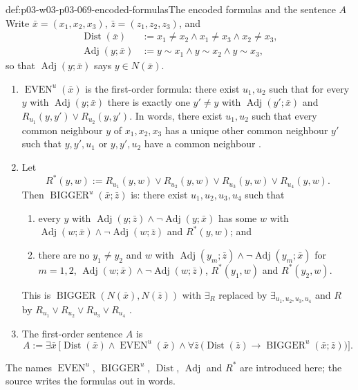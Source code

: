 \begin{hbdefinition}{def:p03-w03-p03-069-encoded-formulas}{The encoded formulas and the sentence \(A\)}
Write \(\bar x=(x_1,x_2,x_3)\), \(\bar z=(z_1,z_2,z_3)\), and
\[
  \begin{aligned}
  \operatorname{Dist}(\bar x)&:=x_1\neq x_2\wedge x_1\neq x_3\wedge x_2\neq x_3,\\
  \operatorname{Adj}(y;\bar x)&:=y\sim x_1\wedge y\sim x_2\wedge y\sim x_3,
  \end{aligned}
\]
so that \(\operatorname{Adj}(y;\bar x)\) says \(y\in N(\bar x)\).
\begin{enumerate}
\item \(\operatorname{EVEN}^u(\bar x)\) is the first-order formula: there
exist \(u_1,u_2\) such that for every \(y\) with \(\operatorname{Adj}(y;\bar x)\)
there is exactly one \(y'\neq y\) with \(\operatorname{Adj}(y';\bar x)\) and
\(R_{u_1}(y,y')\vee R_{u_2}(y,y')\).  In words, there exist \(u_1,u_2\)
such that every common neighbour \(y\) of \(x_1,x_2,x_3\) has a unique other
common neighbour \(y'\) such that \(y,y',u_1\) or \(y,y',u_2\) have a common
neighbour \cite[p.~18]{Spencer2007LogicRandomStructuresAuthor}.
\item Let
\[
  R^{*}(y,w):=R_{u_1}(y,w)\vee R_{u_2}(y,w)\vee R_{u_3}(y,w)\vee R_{u_4}(y,w).
\]
Then \(\operatorname{BIGGER}^u(\bar x;\bar z)\) is: there exist
\(u_1,u_2,u_3,u_4\) such that
\begin{enumerate}
\item every \(y\) with \(\operatorname{Adj}(y;\bar z)\wedge\neg\operatorname{Adj}(y;\bar x)\)
has some \(w\) with \(\operatorname{Adj}(w;\bar x)\wedge\neg\operatorname{Adj}(w;\bar z)\)
and \(R^{*}(y,w)\); and
\item there are no \(y_1\neq y_2\) and \(w\) with
\(\operatorname{Adj}(y_m;\bar z)\wedge\neg\operatorname{Adj}(y_m;\bar x)\) for
\(m=1,2\), \(\operatorname{Adj}(w;\bar x)\wedge\neg\operatorname{Adj}(w;\bar z)\),
\(R^{*}(y_1,w)\) and \(R^{*}(y_2,w)\).
\end{enumerate}
This is \(\operatorname{BIGGER}(N(\bar x),N(\bar z))\) with \(\exists_R\)
replaced by \(\exists_{u_1,u_2,u_3,u_4}\) and \(R\) by
\(R_{u_1}\vee R_{u_2}\vee R_{u_3}\vee R_{u_4}\)
\cite[p.~18]{Spencer2007LogicRandomStructuresAuthor}.
\item The first-order sentence \(A\) is
\[
  A:=\exists\bar x\,\bigl[\operatorname{Dist}(\bar x)\wedge
  \operatorname{EVEN}^u(\bar x)\wedge
  \forall\bar z\,\bigl(\operatorname{Dist}(\bar z)\rightarrow
  \operatorname{BIGGER}^u(\bar x;\bar z)\bigr)\bigr].
\]
\end{enumerate}
The names \(\operatorname{EVEN}^u\), \(\operatorname{BIGGER}^u\),
\(\operatorname{Dist}\), \(\operatorname{Adj}\) and \(R^{*}\) are introduced
here; the source writes the formulas out in words.
\end{hbdefinition}

